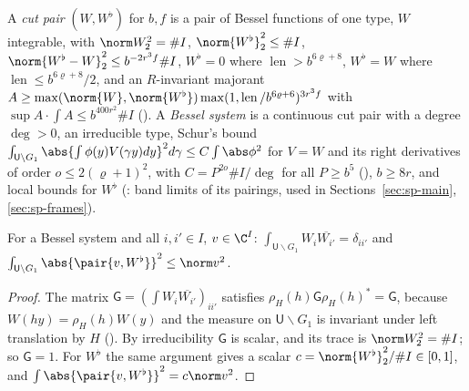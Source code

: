 \begin{definition}\label{sp-moment:def:system}
A \emph{cut pair} $(W,W^\flat)$ for $b,f$ is a pair of Bessel functions of one type, $W$
integrable, with $\norm W_2^2=\#I$, $\norm{W^\flat}_2^2\le\#I$,
$\norm{W^\flat-W}_2^2\le b^{-2r^3f}\#I$, $W^\flat=0$ where $\operatorname{len}>b^{6\varrho+8}$, $W^\flat=W$ where
$\operatorname{len}\le b^{6\varrho+8}/2$, and an $R$-invariant majorant $A\ge\max(\norm{W},\norm{W^\flat})
\max(1,\operatorname{len}/b^{6\varrho+6})^{3r^3f}$ with $\sup A\cdot\int A\le b^{400r^2}\#I$
(). A \emph{Bessel system} is a continuous cut pair with a degree
$\deg>0$, an irreducible type, Schur's bound
$\int_{\mathsf U\backslash G_1}\abs{\int\phi(y)V(\gamma y)dy}^2d\gamma\le C\int\abs\phi^2$ for $V=W$
and its right derivatives of order $o\le2(\varrho+1)^2$, with $C=P^{2o}\#I/\deg$ for all $P\ge b^5$
(), $b\ge8r$, and local bounds for $W^\flat$
(: band limits of its pairings, used in Sections~\ref{sec:sp-main},
\ref{sec:sp-frames}).
\end{definition}

\begin{proposition}\label{sp-moment:prop:orth}
For a Bessel system and all $i,i'\in I$, $v\in\C^I$:
$\int_{\mathsf U\backslash G_1}W_i\overline{W_{i'}}=\delta_{ii'}$ and
$\int_{\mathsf U\backslash G_1}\abs{\pair{v,W^\flat}}^2\le\norm v^2$.
\end{proposition}

\begin{proof}
The matrix $\mathsf G=(\int W_i\overline{W_{i'}})_{ii'}$ satisfies $\rho_H(h)\mathsf G\rho_H(h)^*=\mathsf G$, because
$W(hy)=\rho_H(h)W(y)$ and the measure on $\mathsf U\backslash G_1$ is invariant under left
translation by $H$ (). By irreducibility $\mathsf G$
is scalar, and its trace is $\norm W_2^2=\#I$; so $\mathsf G=1$. For $W^\flat$ the same argument gives a
scalar $c=\norm{W^\flat}_2^2/\#I\in[0,1]$, and $\int\abs{\pair{v,W^\flat}}^2=c\norm v^2$.
\end{proof}

